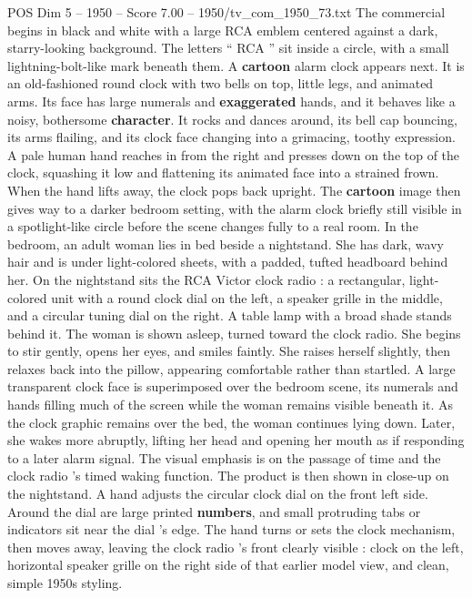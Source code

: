 \begin{textsample}{POS Dim 5 – 1950 – Score 7.00 – 1950/tv\_com\_1950\_73.txt}  \label{ex:f5_pos_073}
The commercial begins in black and white with a large RCA emblem centered against a dark, starry-looking background.
The letters “ RCA ” sit inside a circle, with a small lightning-bolt-like mark beneath them.
A \textbf{cartoon} alarm clock appears next.
It is an old-fashioned round clock with two bells on top, little legs, and animated arms.
Its face has large numerals and \textbf{exaggerated} hands, and it behaves like a noisy, bothersome \textbf{character}.
It rocks and dances around, its bell cap bouncing, its arms flailing, and its clock face changing into a grimacing, toothy expression.
A pale human hand reaches in from the right and presses down on the top of the clock, squashing it low and flattening its animated face into a strained frown.
When the hand lifts away, the clock pops back upright.
The \textbf{cartoon} image then gives way to a darker bedroom setting, with the alarm clock briefly still visible in a spotlight-like circle before the scene changes fully to a real room.
In the bedroom, an adult woman lies in bed beside a nightstand.
She has dark, wavy hair and is under light-colored sheets, with a padded, tufted headboard behind her.
On the nightstand sits the RCA Victor clock radio : a rectangular, light-colored unit with a round clock dial on the left, a speaker grille in the middle, and a circular tuning dial on the right.
A table lamp with a broad shade stands behind it.
The woman is shown asleep, turned toward the clock radio.
She begins to stir gently, opens her eyes, and smiles faintly.
She raises herself slightly, then relaxes back into the pillow, appearing comfortable rather than startled.
A large transparent clock face is superimposed over the bedroom scene, its numerals and hands filling much of the screen while the woman remains visible beneath it.
As the clock graphic remains over the bed, the woman continues lying down.
Later, she wakes more abruptly, lifting her head and opening her mouth as if responding to a later alarm signal.
The visual emphasis is on the passage of time and the clock radio ’s timed waking function.
The product is then shown in close-up on the nightstand.
A hand adjusts the circular clock dial on the front left side.
Around the dial are large printed \textbf{numbers}, and small protruding tabs or indicators sit near the dial ’s edge.
The hand turns or sets the clock mechanism, then moves away, leaving the clock radio ’s front clearly visible : clock on the left, horizontal speaker grille on the right side of that earlier model view, and clean, simple 1950s styling.

\end{textsample}
